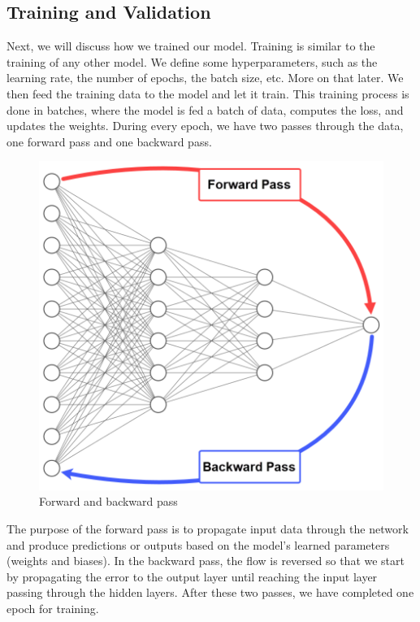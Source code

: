\documentclass[../paper.tex]{subfiles}
\begin{document}
    \subsection{Training and Validation}
    Next, we will discuss how we trained our model.
    Training is similar to the training of any other model.
    We define some hyperparameters, such as the learning rate, the number of epochs, the batch size, etc.
    More on that later.
    We then feed the training data to the model and let it train.
    This training process is done in batches, where the model is fed a batch of data, computes the loss, and updates the weights.
    During every epoch, we have two passes through the data, one forward pass and one backward pass. 
    \begin{figure}[h]
        \centering
        \includegraphics[width=\linewidth]{Backpropagation-passes-architecture}
        \caption{Forward and backward pass}
        \label{fig:forward_backward_pass}
    \end{figure}
    The purpose of the forward pass is to propagate input data through the network and produce predictions or outputs based on the model's learned parameters (weights and biases).\cite{o13}
    In the backward pass, the flow is reversed so that we start by propagating the error to the output layer until reaching the input layer passing through the hidden layers.\cite{o14}
    After these two passes, we have completed one epoch for training.
\end{document}
